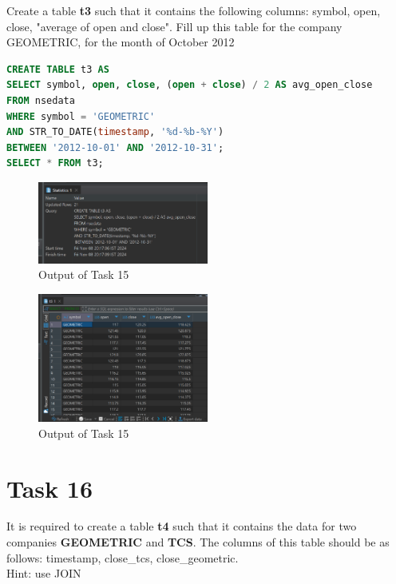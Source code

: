 \documentclass{article}
\begin{document}
\begin{task*}[15]
Create a table \textbf{t3} such that it contains the following columns: symbol, open, close, "average of open and close". Fill up this table for the company GEOMETRIC, for the month of October 2012
\end{task*}

\begin{lstlisting}[language=SQL, caption=Creating Table t3]
CREATE TABLE t3 AS
SELECT symbol, open, close, (open + close) / 2 AS avg_open_close
FROM nsedata
WHERE symbol = 'GEOMETRIC'
AND STR_TO_DATE(timestamp, '%d-%b-%Y')
BETWEEN '2012-10-01' AND '2012-10-31';
SELECT * FROM t3;
\end{lstlisting}

\begin{figure}[H]
	\centering
	\includegraphics[width=0.5\textwidth]{Images/Task15-1.png}
	\caption{Output of Task 15}
\end{figure}

\begin{figure}[H]
	\centering
	\includegraphics[width=0.5\textwidth]{Images/Task15-2.png}
	\caption{Output of Task 15}
\end{figure}

\clearpage

\section*{Task 16}

\begin{task*}[16]
It is required to create a table \textbf{t4} such that it contains the data for two companies \textbf{GEOMETRIC} and \textbf{TCS}. The columns of this table should be as follows: timestamp, close\_tcs, close\_geometric. \\
Hint: use JOIN
\end{task*}
\end{document}
